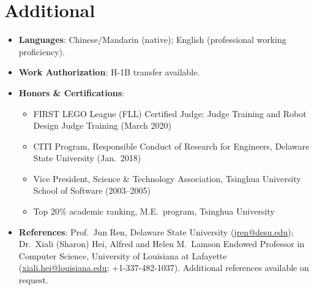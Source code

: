 \documentclass[11pt,a4paper,sans]{moderncv}
\begin{document}
\section{Additional}
\vspace{0pt}
\begin{itemize}
\item \textbf{Languages}: Chinese/Mandarin (native); English (professional working proficiency).
\item \textbf{Work Authorization}: H-1B transfer available.
\item \textbf{Honors \& Certifications}:
  \begin{itemize}
    \item FIRST LEGO League (FLL) Certified Judge: Judge Training and Robot Design Judge Training (March 2020)
    \item CITI Program, Responsible Conduct of Research for Engineers, Delaware State University (Jan.\ 2018)
    \item Vice President, Science \& Technology Association, Tsinghua University School of Software (2003--2005)
    \item Top 20\% academic ranking, M.E.\ program, Tsinghua University
  \end{itemize}
\item \textbf{References}: Prof.\ Jun Ren, Delaware State University (\href{mailto:jren@desu.edu}{jren@desu.edu}); Dr.\ Xiali (Sharon) Hei, Alfred and Helen M.\ Lamson Endowed Professor in Computer Science, University of Louisiana at Lafayette (\href{mailto:xiali.hei@louisiana.edu}{xiali.hei@louisiana.edu}; +1-337-482-1037). Additional references available on request.
\end{itemize}
\end{document}
